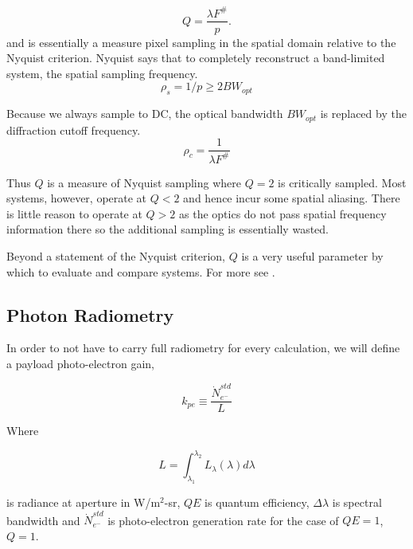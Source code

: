 \documentclass[10pt,journal]{IEEEtran}  %
\begin{document}
\begin{equation}
Q = \frac{\lambda F^\#}{p}.
\label{eq:Q}
\end{equation}
and is essentially a measure pixel sampling in the spatial domain relative to the Nyquist criterion.  Nyquist says that to completely reconstruct a band-limited system, the spatial sampling frequency. 
\begin{equation*}
    \rho_s = 1/p \geq 2 BW_{opt}
\end{equation*}

Because we always sample to DC, the optical bandwidth $BW_{opt}$ is replaced by the diffraction cutoff frequency.
\begin{equation*}
    \rho_c = \frac{1}{\lambda F^\#}
\end{equation*}

Thus $Q$ is a measure of Nyquist sampling where $Q=2$ is critically sampled.  Most systems, however, operate at $Q < 2$ and hence incur some spatial aliasing.  There is little reason to operate at $Q > 2$ as the optics do not pass spatial frequency information there so the additional sampling is essentially wasted.


Beyond a statement of the Nyquist criterion, $Q$ is a very useful parameter by which to evaluate and compare systems.  For more see \cite{fiete_q}.  

\subsection{Photon Radiometry}

In order to not have to carry full radiometry for every calculation, we will define a payload photo-electron gain, 

\begin{equation}
k_{pe} \equiv \frac{\dot{N}_{e^-}^{std}}{L}
\label{eq:k_pe}
\end{equation}

Where 

\begin{equation*}
    L = \int_{\lambda_1}^{\lambda_2}L_{\lambda}(\lambda)d\lambda
\end{equation*}

is radiance at aperture in W/m$^2$-sr, $QE$ is quantum efficiency, $\Delta \lambda$ is spectral bandwidth and $\dot{N}_{e^-}^{std}$ is photo-electron generation rate for the case of $QE=1$, $Q=1$.
\end{document}
